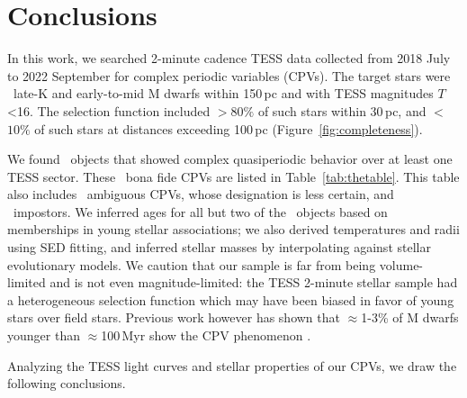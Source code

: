 \documentclass[11pt,twocolumn,tighten,linenumbers]{aastex63}
\begin{document}
\section{Conclusions}
\label{sec:conclusion}

In this work, we searched 2-minute cadence TESS data collected from
2018 July to 2022 September for complex periodic variables (CPVs).
The target stars were \nstarssearched\ late-K and early-to-mid M
dwarfs within 150\,pc and with TESS magnitudes $T$<16.  The selection
function included $>$$80\%$ of such stars within 30\,pc, and $<$$10\%$
of such stars at distances exceeding 100\,pc
(Figure~\ref{fig:completeness}).

We found \ngoods\ objects that showed complex quasiperiodic behavior
over at least one TESS sector.  These \ngoods\ bona fide CPVs are
listed in Table~\ref{tab:thetable}.  This table also includes
\nmaybes\ ambiguous CPVs, whose designation is less certain, and
\ndebunked\ impostors.  We inferred ages for all but two of the
\nallcands\ objects based on memberships in young stellar
associations; we also derived temperatures and radii using SED
fitting, and inferred stellar masses by interpolating against stellar
evolutionary models.  We caution that our sample is far from being
volume-limited and is not even magnitude-limited: the TESS 2-minute
stellar sample had a heterogeneous selection function which may have
been biased in favor of young stars over field stars.  Previous work
however has shown that $\approx$1-3\% of M dwarfs younger than
$\approx$100\,Myr show the CPV phenomenon
\citep{2016AJ....152..114R,2022AJ....163..144G,2022AJ....164...80R}.

Analyzing the TESS light curves and stellar properties of our CPVs, we
draw the following conclusions.
\end{document}
